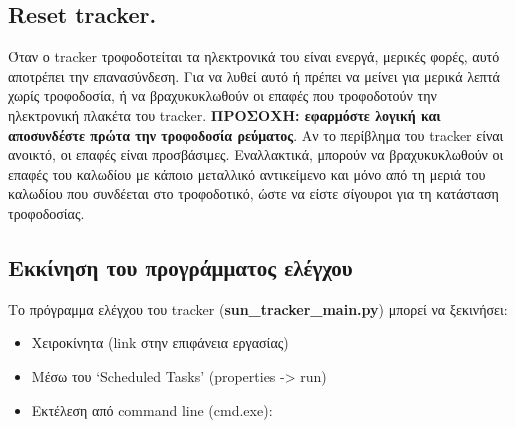 \documentclass[
  a4paper,
  twoside,
  titlepage,
  12pt]{article}
\providecommand{\tightlist}{%
  \setlength{\itemsep}{0pt}\setlength{\parskip}{0pt}}
\numberwithin{equation}{section}
\numberwithin{figure}{section}
\numberwithin{table}{section}
\begin{document}
\vspace{-1.05\baselineskip}

\hypertarget{reset-tracker.}{%
\subsection*{Reset tracker.}\label{reset-tracker.}}

\vspace{-0.6\baselineskip}

Όταν ο tracker τροφοδοτείται τα ηλεκτρονικά του είναι ενεργά, μερικές φορές, αυτό αποτρέπει την επανασύνδεση.
Για να λυθεί αυτό ή πρέπει να μείνει για μερικά λεπτά χωρίς τροφοδοσία, ή να βραχυκυκλωθούν οι επαφές που τροφοδοτούν την ηλεκτρονική πλακέτα του tracker.
\textbf{ΠΡΟΣΟΧΗ: εφαρμόστε λογική και αποσυνδέστε πρώτα την τροφοδοσία ρεύματος}.
Αν το περίβλημα του tracker είναι ανοικτό, οι επαφές είναι προσβάσιμες. Εναλλακτικά, μπορούν να βραχυκυκλωθούν οι επαφές του καλωδίου με κάποιο μεταλλικό αντικείμενο και μόνο από τη μεριά του καλωδίου που συνδέεται στο τροφοδοτικό, ώστε να είστε σίγουροι για τη κατάσταση τροφοδοσίας.

\vspace{-1.05\baselineskip}

\hypertarget{ux3b5ux3baux3baux3afux3bdux3b7ux3c3ux3b7-ux3c4ux3bfux3c5-ux3c0ux3c1ux3bfux3b3ux3c1ux3acux3bcux3bcux3b1ux3c4ux3bfux3c2-ux3b5ux3bbux3adux3b3ux3c7ux3bfux3c5}{%
\subsection*{Εκκίνηση του προγράμματος ελέγχου}\label{ux3b5ux3baux3baux3afux3bdux3b7ux3c3ux3b7-ux3c4ux3bfux3c5-ux3c0ux3c1ux3bfux3b3ux3c1ux3acux3bcux3bcux3b1ux3c4ux3bfux3c2-ux3b5ux3bbux3adux3b3ux3c7ux3bfux3c5}}

\vspace{-0.6\baselineskip}

Το πρόγραμμα ελέγχου του tracker (\textbf{sun\_tracker\_main.py}) μπορεί να ξεκινήσει:

\begin{itemize}
\tightlist
\item
  Χειροκίνητα (link στην επιφάνεια εργασίας)
\item
  Μέσω του `Scheduled Tasks' (properties -\textgreater{} run)
\item
  Εκτέλεση από command line (cmd.exe):
\end{itemize}
\end{document}

